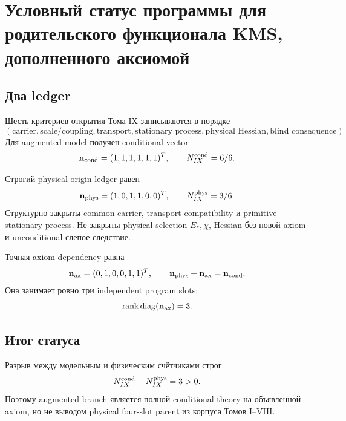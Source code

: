 \chapter{Условный статус программы для родительского функционала KMS, дополненного аксиомой}
\label{ch:v9-kms-conditional-program-status}

\section{Два ledger}

Шесть критериев открытия Тома IX записываются в порядке
\begin{equation}
 (\text{carrier},\text{scale/coupling},\text{transport},
 \text{stationary process},\text{physical Hessian},\text{blind consequence}).
 \label{eq:v9-kms-status-criteria}
\end{equation}
Для augmented model получен conditional vector
\begin{equation}
 \mathbf n_{\rm cond}=(1,1,1,1,1,1)^T,
 \qquad N_{IX}^{\rm cond}=6/6.
 \label{eq:v9-kms-status-conditional}
\end{equation}

Строгий physical-origin ledger равен
\begin{equation}
 \mathbf n_{\rm phys}=(1,0,1,1,0,0)^T,
 \qquad N_{IX}^{\rm phys}=3/6.
 \label{eq:v9-kms-status-physical}
\end{equation}
Структурно закрыты common carrier, transport compatibility и primitive
stationary process. Не закрыты physical selection $E_*,\chi$, Hessian без
новой axiom и unconditional слепое следствие.

Точная axiom-dependency равна
\begin{equation}
 \mathbf n_{\rm ax}=(0,1,0,0,1,1)^T,
 \qquad \mathbf n_{\rm phys}+\mathbf n_{\rm ax}=\mathbf n_{\rm cond}.
 \label{eq:v9-kms-status-decomposition}
\end{equation}
Она занимает ровно три independent program slots:
\begin{equation}
 \operatorname{rank}\operatorname{diag}(\mathbf n_{\rm ax})=3.
 \label{eq:v9-kms-status-dependency-rank}
\end{equation}

\section{Итог статуса}

Разрыв между модельным и физическим счётчиками строг:
\begin{equation}
 N_{IX}^{\rm cond}-N_{IX}^{\rm phys}=3>0.
 \label{eq:v9-kms-status-gap}
\end{equation}
Поэтому augmented branch является полной conditional theory на объявленной
axiom, но не выводом physical four-slot parent из корпуса Томов I--VIII.

